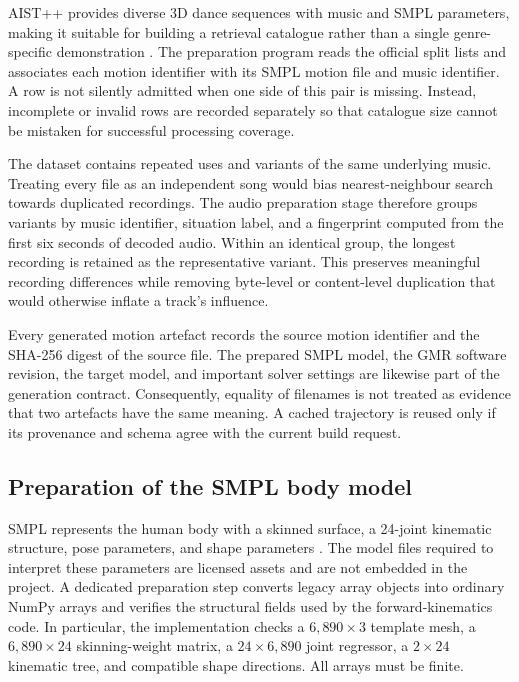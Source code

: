 AIST++ provides diverse 3D dance sequences with music and SMPL parameters,
making it suitable for building a retrieval catalogue rather than a single
genre-specific demonstration \cite{li2021ai}. The preparation program reads the
official split lists and associates each motion identifier with its SMPL motion
file and music identifier. A row is not silently admitted when one side of this
pair is missing. Instead, incomplete or invalid rows are recorded separately so
that catalogue size cannot be mistaken for successful processing coverage.

The dataset contains repeated uses and variants of the same underlying music.
Treating every file as an independent song would bias nearest-neighbour search
towards duplicated recordings. The audio preparation stage therefore groups
variants by music identifier, situation label, and a fingerprint computed from
the first six seconds of decoded audio. Within an identical group, the longest
recording is retained as the representative variant. This preserves meaningful
recording differences while removing byte-level or content-level duplication
that would otherwise inflate a track's influence.

Every generated motion artefact records the source motion identifier and the
SHA-256 digest of the source file. The prepared SMPL model, the GMR software
revision, the target model, and important solver settings are likewise part of
the generation contract. Consequently, equality of filenames is not treated as
evidence that two artefacts have the same meaning. A cached trajectory is reused
only if its provenance and schema agree with the current build request.

\subsection{Preparation of the SMPL body model}
\label{subsec:smpl_preparation}

SMPL represents the human body with a skinned surface, a 24-joint kinematic
structure, pose parameters, and shape parameters \cite{loper2023smpl}. The model
files required to interpret these parameters are licensed assets and are not
embedded in the project. A dedicated preparation step converts legacy array
objects into ordinary NumPy arrays and verifies the structural fields used by
the forward-kinematics code. In particular, the implementation checks a
$6{,}890\times3$ template mesh, a $6{,}890\times24$ skinning-weight matrix, a
$24\times6{,}890$ joint regressor, a $2\times24$ kinematic tree, and compatible
shape directions. All arrays must be finite.

